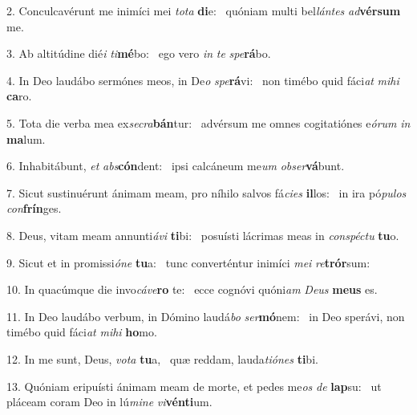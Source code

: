 2. Conculcavérunt me inimíci mei \textit{to}\textit{ta} \textbf{di}e: \ast\  quóniam multi bel\textit{lán}\textit{tes} \textit{ad}\textbf{vér}\textbf{sum} me.\

3. Ab altitúdine dié\textit{i} \textit{ti}\textbf{mé}bo: \ast\  ego vero \textit{in} \textit{te} \textit{spe}\textbf{rá}bo.\

4. In Deo laudábo sermónes meos, in De\textit{o} \textit{spe}\textbf{rá}vi: \ast\  non timébo quid fáci\textit{at} \textit{mi}\textit{hi} \textbf{ca}ro.\

5. Tota die verba mea ex\textit{se}\textit{cra}\textbf{bán}tur: \ast\  advérsum me omnes cogitatiónes e\textit{ó}\textit{rum} \textit{in} \textbf{ma}lum.\

6. Inhabitábunt, \textit{et} \textit{abs}\textbf{cón}dent: \ast\  ipsi calcáneum me\textit{um} \textit{ob}\textit{ser}\textbf{vá}bunt.\

7. Sicut sustinuérunt ánimam meam, pro níhilo salvos fá\textit{ci}\textit{es} \textbf{il}los: \ast\  in ira pó\textit{pu}\textit{los} \textit{con}\textbf{frín}ges.\

8. Deus, vitam meam annunti\textit{á}\textit{vi} \textbf{ti}bi: \ast\  posuísti lácrimas meas in \textit{con}\textit{spéc}\textit{tu} \textbf{tu}o.\

9. Sicut et in promissi\textit{ó}\textit{ne} \textbf{tu}a: \ast\  tunc converténtur inimíci \textit{me}\textit{i} \textit{re}\textbf{trór}sum:\

10. In quacúmque die invo\textit{cá}\textit{ve}\textbf{ro} te: \ast\  ecce cognóvi quóni\textit{am} \textit{De}\textit{us} \textbf{me}\textbf{us} es.\

11. In Deo laudábo verbum, in Dómino laudá\textit{bo} \textit{ser}\textbf{mó}nem: \ast\  in Deo sperávi, non timébo quid fáci\textit{at} \textit{mi}\textit{hi} \textbf{ho}mo.\

12. In me sunt, Deus, \textit{vo}\textit{ta} \textbf{tu}a, \ast\  quæ reddam, lauda\textit{ti}\textit{ó}\textit{nes} \textbf{ti}bi.\

13. Quóniam eripuísti ánimam meam de morte, et pedes me\textit{os} \textit{de} \textbf{lap}su: \ast\  ut pláceam coram Deo in lú\textit{mi}\textit{ne} \textit{vi}\textbf{vén}\textbf{ti}um.\

